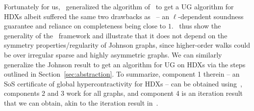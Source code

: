 Fortunately for us,~\cite{DBLP:conf/soda/BafnaHKL22} generalized the algorithm of~\cite{BBKSS} to get a UG algorithm for HDXs albeit suffered the same two drawbacks as~\cite{BBKSS} -- an $\ell$-dependent soundness guarantee and reliance on completeness being close to $1$.~\cite{DBLP:conf/soda/BafnaHKL22} thus show the generality of the~\cite{BBKSS} framework and illustrate that it does not depend on the symmetry properties/regularity of Johnson graphs, since higher-order walks could be over irregular sparse and highly asymmetric graphs. We can similarly generalize the Johnson result to get an algorithm for UG on HDXs via the steps outlined in Section~\ref{sec:abstraction}. To summarize, component 1 therein -- an SoS certificate of global hypercontractivity for HDXs -- can be obtained using~\cite{bafna2022hypercontractivity}, components 2 and 3 work for all graphs, and  component 4 is an iteration result that we can obtain, akin to the iteration result in~\cite{DBLP:conf/soda/BafnaHKL22}.









